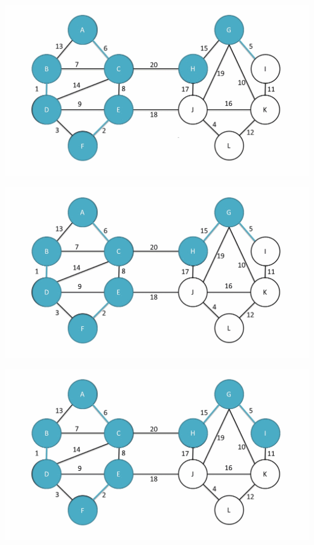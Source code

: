 \documentclass[
	11pt, %
]{beamer}
\begin{document}
\begin{frame}
    \includegraphics[width = 1\textwidth]{baruvka-example/frame_12_delay-1s.png}
\end{frame}
\begin{frame}
    \includegraphics[width = 1\textwidth]{baruvka-example/frame_13_delay-1s.png}
\end{frame}
\begin{frame}
    \includegraphics[width = 1\textwidth]{baruvka-example/frame_14_delay-2s.png}
\end{frame}
\end{document}
